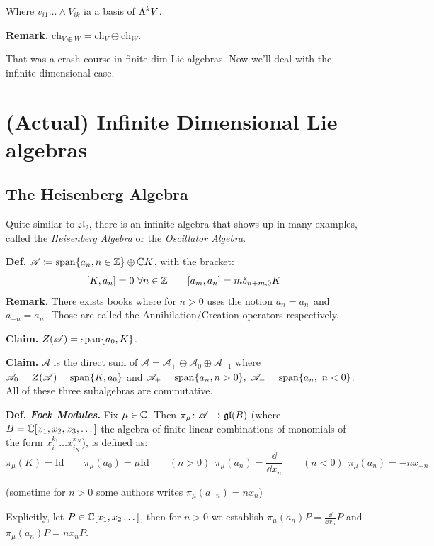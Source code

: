 \documentclass[]{../../../../tex/classes/styledArticle}
\newcommand\gl {\mathfrak{gl}}
\newcommand\Sl {\mathfrak{sl}}
\newcommand\asc{\mathscr{A}}
\begin{document}
	Where $v_{i1} \dots\land V_{ik}$ ia a basis of $\Lambda^{k}V$. 
	
	\textbf{Remark.} $\mathrm{ch}_{V \oplus W} = \mathrm{ch}_{V } \oplus \mathrm{ch}_{W}$. 
	
	
	
	
	That was a crash course in finite-dim Lie algebras. Now we'll deal with the infinite dimensional case. 
	
	\section*{(Actual) Infinite Dimensional Lie algebras}
	\subsection{The Heisenberg Algebra}
	
	Quite similar to $\Sl_2$, there is an infinite algebra that shows up in many examples, called the \textit{Heisenberg Algebra} or the \textit{Oscillator Algebra}. 
	
	\textbf{Def. }$\asc \cod \Sp\{a_n, n \in \Z\} \oplus \C K$, with the bracket: 
	\[ [K, a_n] = 0 \ \forall n \in \mathbb{Z} \quad\quad [a_m, a_n] = m \delta_{n + m, 0}K \]
	\textbf{Remark}. There exists books where for $n > 0$ uses the notion $a_n = a_n^{+}$ and $a_{-n} = a_n^{-}$. Those are called the Annihilation/Creation operators respectively. 
	
	\textbf{Claim. }$Z(\asc) = \Sp\{a_0, K\}$. 
	
	\textbf{Claim. }$\asc$ is the direct sum of $\asc = \asc_+ \oplus \asc_0 \oplus \asc_{-1}$ where $\asc_0 = Z(\asc) = \Sp\{K, a_0\}$ and $\asc_+ = \Sp\{a_n, n > 0\}, \ \asc_- = \Sp\{a_n, \ n< 0\}$. All of these three subalgebras are commutative. 
	
	
	\textbf{Def. \textit{Fock Modules}. }Fix $\mu \in \mathbb{C}$. Then $\pi_\mu \co \asc \to \gl(B)$ (where $B = \mathbb{C}[x_1, x_2, x_3, \dots ]$ the algebra of finite-linear-combinations of monomials of the form $x_i^{k_1} \dots x_{i_N}^{x_N}$), is defined as: 
	\[ \pi_\mu(K) = \mathrm{Id} \quad \quad \pi_\mu(a_0) = \mu \mathrm{Id}\quad\quad (n> 0) \ \ \pi_{\mu}(a_n) = \frac{\dd}{\dd x_n}\quad \quad (n < 0) \ \ \pi_\mu(a_n) = -nx_{-n} \]
	
	(sometime for $n > 0$ some authors writes $\pi_{\mu}(a_{-n}) =nx_n$)
	
	Explicitly, let $P \in \mathbb{C}[x_1, x_2 \dots ]$, then for $n > 0$ we establish $\pi_\mu(a_n) P= \frac{\dd}{\dd x_n}P$ and $\pi_\mu(a_n)P = nx_n P$. 
	
\end{document}
